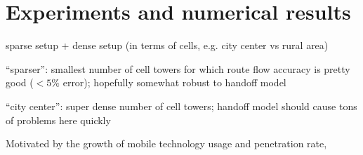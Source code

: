 
\section{Experiments and numerical results}

sparse setup + dense setup (in terms of cells, e.g. city center vs rural area)

“sparser”: smallest number of cell towers for which route flow accuracy is pretty good ($<5\%$ error); hopefully somewhat robust to handoff model

“city center”: super dense number of cell towers; handoff model should cause tons of problems here quickly

Motivated by the growth of mobile technology usage and penetration rate, \cite{}
